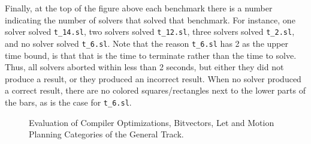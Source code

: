 Finally, at the top of the figure above each benchmark there is a number indicating the number of solvers that solved that benchmark. For instance, one solver solved \texttt{t\_14.sl}, two solvers solved \texttt{t\_12.sl}, three solvers solved \texttt{t\_2.sl}, and no solver solved \texttt{t\_6.sl}. Note that the reason \texttt{t\_6.sl} has 2 as the upper time bound, is that that is the time to terminate rather than the time to solve. Thus, all solvers aborted within less than 2 seconds, but either they did not produce a result, or they produced an incorrect result. When no solver produced a correct result, there are no colored squares/rectangles next to the lower parts of the bars, as is the case for \texttt{t\_6.sl}.


\begin{figure}
\noindent{}
	\caption{Evaluation of Compiler Optimizations, Bitvectors, Let and Motion Planning Categories of the General Track.}\label{fig:let-mot-plan}
\end{figure}



